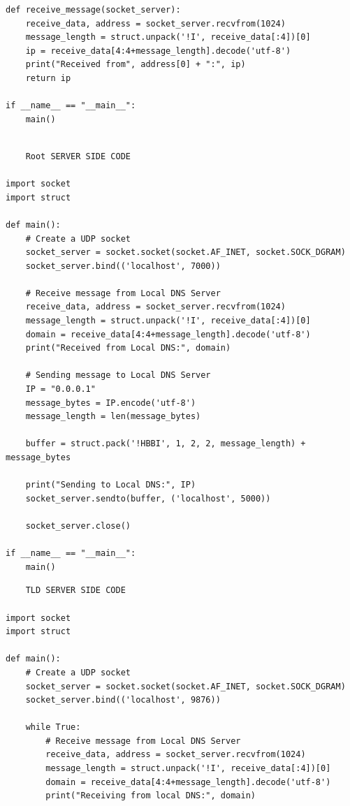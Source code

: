 \documentclass[11pt]{article}
\begin{document}
\begin{itemize}
\begin{verbatim}
def receive_message(socket_server):
    receive_data, address = socket_server.recvfrom(1024)
    message_length = struct.unpack('!I', receive_data[:4])[0]
    ip = receive_data[4:4+message_length].decode('utf-8')
    print("Received from", address[0] + ":", ip)
    return ip

if __name__ == "__main__":
    main()


\end{verbatim}
  
  \begin{verbatim}
    Root SERVER SIDE CODE
    
import socket
import struct

def main():
    # Create a UDP socket
    socket_server = socket.socket(socket.AF_INET, socket.SOCK_DGRAM)
    socket_server.bind(('localhost', 7000))

    # Receive message from Local DNS Server
    receive_data, address = socket_server.recvfrom(1024)
    message_length = struct.unpack('!I', receive_data[:4])[0]
    domain = receive_data[4:4+message_length].decode('utf-8')
    print("Received from Local DNS:", domain)

    # Sending message to Local DNS Server
    IP = "0.0.0.1"
    message_bytes = IP.encode('utf-8')
    message_length = len(message_bytes)

    buffer = struct.pack('!HBBI', 1, 2, 2, message_length) + message_bytes

    print("Sending to Local DNS:", IP)
    socket_server.sendto(buffer, ('localhost', 5000))

    socket_server.close()

if __name__ == "__main__":
    main()

\end{verbatim}
  \begin{verbatim}
    TLD SERVER SIDE CODE
    
import socket
import struct

def main():
    # Create a UDP socket
    socket_server = socket.socket(socket.AF_INET, socket.SOCK_DGRAM)
    socket_server.bind(('localhost', 9876))

    while True:
        # Receive message from Local DNS Server
        receive_data, address = socket_server.recvfrom(1024)
        message_length = struct.unpack('!I', receive_data[:4])[0]
        domain = receive_data[4:4+message_length].decode('utf-8')
        print("Receiving from local DNS:", domain)


\end{verbatim}
\end{itemize}
\end{document}
